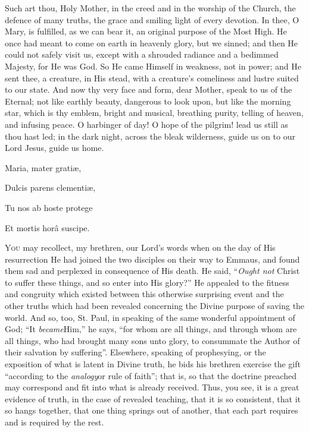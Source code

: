 Such art thou, Holy Mother, in the creed and in the worship of the
Church, the defence of many truths, the grace and smiling light of
every devotion. In thee, O Mary, is fulfilled, as we can bear it, an
original purpose of the Most High. He once had meant to come on earth
in heavenly glory, but we sinned; and then He could not safely visit
us, except with a shrouded radiance and a bedimmed Majesty, for He was
God. So He came Himself in weakness, not in power; and He sent thee, a
creature, in His stead, with a creature's comeliness and lustre suited
to our state. And now thy very face and form, dear Mother, speak to us
of the Eternal; not like earthly beauty, dangerous to look upon, but
like the morning star, which is thy emblem, bright and musical,
breathing purity, telling of heaven, and infusing peace. O harbinger
of day! O hope of the pilgrim! lead us still as thou hast led; in the
dark night, across the bleak wilderness, guide us on to our Lord
Jesus, guide us home.

Maria, mater gratiæ,

Dulcis parens clementiæ,

Tu nos ab hoste protege

Et mortis horâ suscipe.


Y\textsc{ou} may recollect, my brethren, our Lord's words when on the day of
His resurrection He had joined the two disciples on their way to
Emmaus, and found them sad and perplexed in consequence of His death.
He said, ``\emph{Ought not} Christ to suffer these things, and so
enter into His glory?'' He appealed to the fitness and congruity
which existed between this otherwise surprising event and the other
truths which had been revealed concerning the Divine purpose of saving
the world. And so, too, St. Paul, in speaking of the same wonderful
appointment of God; ``It \emph{became}Him,'' he says,
``for whom are all things, and through whom are all things, who
had brought many sons unto glory, to consummate the Author of their
salvation by suffering''. Elsewhere, speaking of prophesying, or
the exposition of what is latent in Divine truth, he bids his brethren
exercise the gift ``according to the \emph{analogy}or rule of
faith''; that is, so that the doctrine preached may correspond and
fit into what is already received. Thus, you see, it is a great
evidence of truth, in the case of revealed teaching, that it is so
consistent, that it so hangs together, that one thing springs out of
another, that each part requires and is required by the rest.

